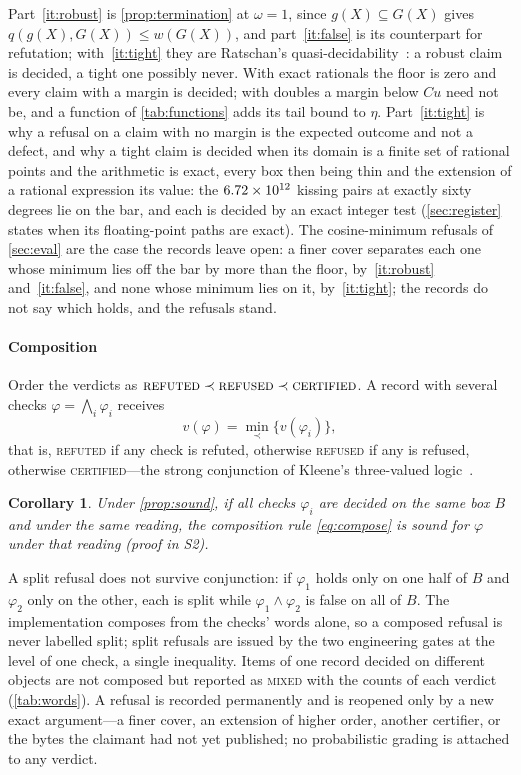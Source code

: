 \documentclass[preprint,11pt,a4paper]{elsarticle}
\newtheorem{corollary}{Corollary}
\theoremstyle{definition}
\newcommand{\verdict}[1]{\textup{\textsc{#1}}}
\newcommand{\CERT}{\verdict{certified}}
\newcommand{\REFT}{\verdict{refuted}}
\newcommand{\REFS}{\verdict{refused}}
\newcommand{\supp}[1]{S#1}
\begin{document}
Part~\ref{it:robust} is \cref{prop:termination} at $\omega=1$, since $g(X)\subseteq G(X)$ gives $q(g(X),G(X))\le w(G(X))$, and part~\ref{it:false} is its counterpart for refutation; with~\ref{it:tight} they are Ratschan's quasi-decidability~\citep{Ratschan06}: a robust claim is decided, a tight one possibly never. With exact rationals the floor is zero and every claim with a margin is decided; with doubles a margin below $Cu$ need not be, and a function of \cref{tab:functions} adds its tail bound to $\eta$. Part~\ref{it:tight} is why a refusal on a claim with no margin is the expected outcome and not a defect, and why a tight claim is decided when its domain is a finite set of rational points and the arithmetic is exact, every box then being thin and the extension of a rational expression its value: the $6.72 \times 10^{12}$ kissing pairs at exactly sixty degrees lie on the bar, and each is decided by an exact integer test (\cref{sec:register} states when its floating-point paths are exact). The \MtEvStraddles{} cosine-minimum refusals of \cref{sec:eval} are the case the records leave open: a finer cover separates each one whose minimum lies off the bar by more than the floor, by~\ref{it:robust} and~\ref{it:false}, and none whose minimum lies on it, by~\ref{it:tight}; the records do not say which holds, and the refusals stand.

\paragraph{Composition}
Order the verdicts as $\REFT\prec\REFS\prec\CERT$. A record with several checks $\varphi=\bigwedge_i\varphi_i$ receives
\begin{equation}\label{eq:compose}
v(\varphi)=\min_{\prec}\{v(\varphi_i)\},
\end{equation}
that is, \REFT{} if any check is refuted, otherwise \REFS{} if any is refused, otherwise \CERT---the strong conjunction of Kleene's three-valued logic~\citep{Kleene38}.

\begin{corollary}\label{cor:compose}
Under \cref{prop:sound}, if all checks $\varphi_i$ are decided on the same box $B$ and under the same reading, the composition rule \cref{eq:compose} is sound for $\varphi$ under that reading (proof in \supp{2}).
\end{corollary}
A split refusal does not survive conjunction: if $\varphi_1$ holds only on one half of $B$ and $\varphi_2$ only on the other, each is split while $\varphi_1\wedge\varphi_2$ is false on all of $B$. The implementation composes from the checks' words alone, so a composed refusal is never labelled split; split refusals are issued by the two engineering gates at the level of one check, a single inequality. Items of one record decided on different objects are not composed but reported as \verdict{mixed} with the counts of each verdict (\cref{tab:words}). A refusal is recorded permanently and is reopened only by a new exact argument---a finer cover, an extension of higher order, another certifier, or the bytes the claimant had not yet published; no probabilistic grading is attached to any verdict.
\end{document}
